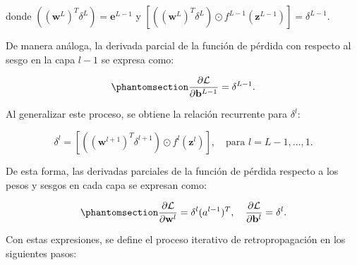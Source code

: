 \documentclass[
  us-letterpaper,
]{scrreprt}
\theoremstyle{plain}
\theoremstyle{definition}
\theoremstyle{definition}
\theoremstyle{plain}
\theoremstyle{remark}
\begin{document}
donde \(((\mathbf w^L)^T \delta^L) = \mathbf e^{L-1}\) y
\([((\mathbf w^L)^T \delta^L)\odot f^{L-1}(\mathbf z^{L-1})] = \delta^{L-1}\).

De manera análoga, la derivada parcial de la función de pérdida con
respecto al sesgo en la capa \(l-1\) se expresa como:

\begin{equation}\phantomsection\label{eq-24}{\frac{\partial \mathcal L}{\partial \mathbf b^{L-1}} = \delta^{L-1}.}\end{equation}

Al generalizar este proceso, se obtiene la relación recurrente para
\(\delta^l\):

\[\delta^l = \left[((\mathbf w^{l+1})^T \delta^{l+1})\odot f^l(\mathbf z^l) \right], \quad \text{para } l = L-1, \ldots, 1.\]

De esta forma, las derivadas parciales de la función de pérdida respecto
a los pesos y sesgos en cada capa se expresan como:

\begin{equation}\phantomsection\label{eq-25}{\frac{\partial \mathcal L}{\partial \mathbf w^l} = \delta^l (a^{l-1})^T,\quad \frac{\partial \mathcal L}{\partial \mathbf b^l} = \delta^l.}\end{equation}

Con estas expresiones, se define el proceso iterativo de
retropropagación en los siguientes pasos:
\end{document}
